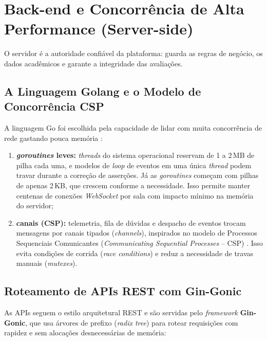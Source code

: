 \section{Back-end e Concorrência de Alta Performance (Server-side)}
\label{sec:backend-golang}

O servidor é a autoridade confiável da plataforma: guarda as regras de negócio, os dados acadêmicos e garante a integridade das avaliações.

\subsection{A Linguagem Golang e o Modelo de Concorrência CSP}
\label{sec:golang-concorrencia}

A linguagem Go \cite{donovan2015go} foi escolhida pela capacidade de lidar com muita concorrência de rede gastando pouca memória \cite{cox2020golang}:

\begin{enumerate}
    \item \textbf{\textit{goroutines} leves:} \textit{threads} do sistema operacional reservam de 1 a 2\,MB de pilha cada uma, e modelos de \textit{loop} de eventos em uma única \textit{thread} podem travar durante a correção de asserções. Já as \textit{goroutines} começam com pilhas de apenas 2\,KB, que crescem conforme a necessidade. Isso permite manter centenas de conexões \textit{WebSocket} por sala com impacto mínimo na memória do servidor;
    \item \textbf{canais (CSP):} telemetria, fila de dúvidas e despacho de eventos trocam mensagens por canais tipados (\textit{channels}), inspirados no modelo de Processos Sequenciais Comunicantes (\textit{Communicating Sequential Processes} -- CSP) \cite{donovan2015go,cox2020golang}. Isso evita condições de corrida (\textit{race conditions}) e reduz a necessidade de travas manuais (\textit{mutexes}).
\end{enumerate}

\subsection{Roteamento de APIs REST com Gin-Gonic}
\label{sec:gin-gonic}

As APIs seguem o estilo arquitetural REST \cite{fielding2000rest} e são servidas pelo \textit{framework} \textbf{Gin-Gonic}, que usa árvores de prefixo (\textit{radix tree}) para rotear requisições com rapidez e sem alocações desnecessárias de memória:

